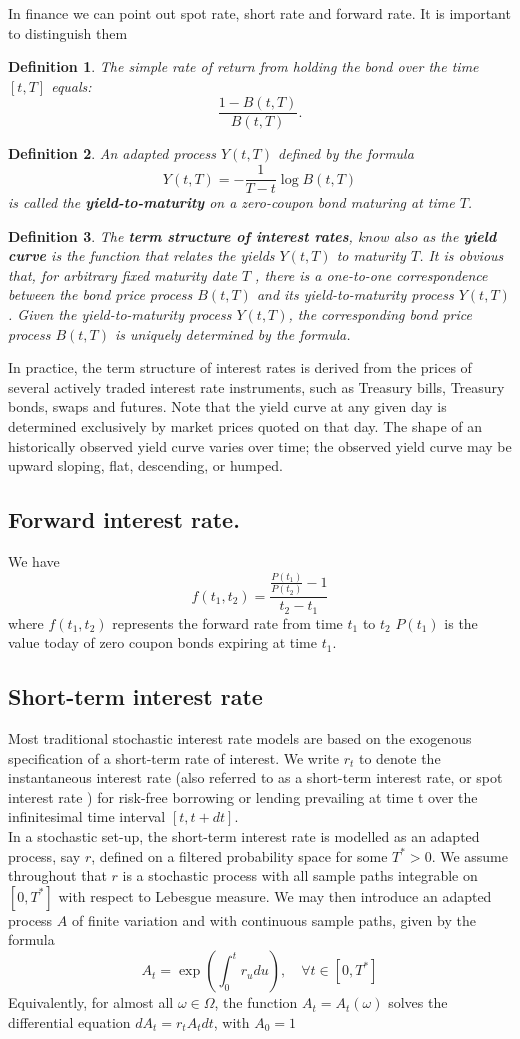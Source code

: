 \documentclass{book}
\newtheorem{definition}{Definition}[section]
\begin{document}
In finance we can  point out spot rate, short rate and forward rate. It is important to distinguish them
\begin{definition}
The simple rate of return from holding the bond over the time $[t,T]$ equals:
$$
\frac{1-B(t,T)}{B(t,T)}.
$$
\end{definition}
\begin{definition}
An adapted process $Y(t,T)$ defined by the formula
$$
Y(t,T)=-\frac{1}{T-t}\log B(t,T)
$$
is called the \textbf{yield-to-maturity} on a zero-coupon bond maturing at time $T$.
\end{definition}
\begin{definition}
The \textbf{term structure of interest rates}, know also as the \textbf{yield curve} is the function 
that relates the yields $Y(t,T)$ to maturity $T$. It is obvious that, for arbitrary
fixed maturity date $T$ , there is a one-to-one correspondence between the bond
price process $B(t,T)$ and its yield-to-maturity process $Y(t,T)$. Given the yield-to-maturity
process $Y(t,T)$, the corresponding bond price process $B(t,T)$ is uniquely
determined by the formula.

\end{definition}
In practice, the term structure of interest rates is derived from the prices of several actively
traded interest rate instruments, such as Treasury bills, Treasury bonds, swaps
and futures. Note that the yield curve at any given day is determined exclusively by
market prices quoted on that day. The shape of an historically observed yield curve
varies over time; the observed yield curve may be upward sloping, flat, descending,
or humped.
\subsection{Forward interest rate.}
We have
$$
f(t_{1},t_{2})=\frac{\frac{P(t_{1})}{P(t_{2})}-1}{t_{2}-t_{1}}
$$
where
$f(t_{1},t_{2})$ represents the forward rate from time $t_{1}$ to $t_{2}$ $P(t_{1})$ is the value today of zero coupon bonds expiring at time $t_{1}$. 
\subsection{Short-term interest rate}
Most traditional stochastic interest rate models are based on the exogenous specification
of a short-term rate of interest. We write $r_{t}$ to denote the instantaneous interest
rate (also referred to as a short-term interest rate, or spot interest rate ) for risk-free
borrowing or lending prevailing at time t over the infinitesimal time interval
$[t, t + dt]$.\\
In a stochastic set-up, the short-term interest rate is modelled as an adapted
process, say $r$, defined on a filtered probability space for some $T^{\ast}>0$. We assume throughout  that $r$ is a stochastic process with all sample paths integrable on $[0,T^{\ast}]$ with respect to Lebesgue measure. We may then introduce an adapted process $A$ of finite variation and with continuous sample paths, given by the formula 
$$
A_{t}=\exp\left(\int_{0}^{t}r_{u}du\right),\quad \forall t\in[0,T^{\ast}]
$$
Equivalently, for almost all $\omega\in\varOmega$, the function $A_{t}=A_{t}(\omega)$ solves the differential equation $dA_{t}=r_{t}A_{t}dt$, with $A_{0}=1$
\end{document}
